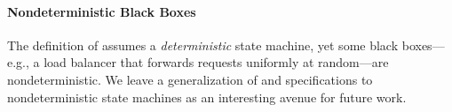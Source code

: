 \paragraph{Nondeterministic Black Boxes}
The definition of \watprovenance{} assumes a \emph{deterministic} state
machine, yet some black boxes---e.g., a load balancer that forwards requests
uniformly at random---are nondeterministic. We leave a generalization of
\watprovenance{} and \watprovenance{} specifications to nondeterministic state
machines as an interesting avenue for future work.

